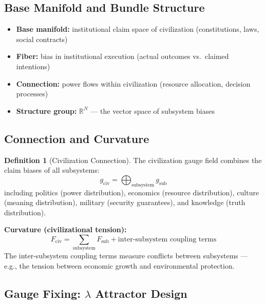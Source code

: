 \documentclass[12pt,a4paper]{article}
\theoremstyle{plain}
\theoremstyle{definition}
\newtheorem{definition}[theorem]{Definition}
\newcommand{\R}{\mathbb{R}}
\begin{document}
\subsection{Base Manifold and Bundle Structure}

\begin{itemize}
    \item \textbf{Base manifold:} institutional claim space of civilization (constitutions, laws, social contracts)
    \item \textbf{Fiber:} bias in institutional execution (actual outcomes vs.\ claimed intentions)
    \item \textbf{Connection:} power flows within civilization (resource allocation, decision processes)
    \item \textbf{Structure group:} $\R^N$ — the vector space of subsystem biases
\end{itemize}

\subsection{Connection and Curvature}

\begin{definition}[Civilization Connection]
The civilization gauge field combines the claim biases of all subsystems:
\begin{equation}
    g_{\text{civ}} = \bigoplus_{\text{subsystem}} g_{\text{sub}}
\end{equation}
including politics (power distribution), economics (resource distribution), culture (meaning distribution),
military (security guarantees), and knowledge (truth distribution).

\textbf{Curvature (civilizational tension):}
\begin{equation}
    F_{\text{civ}} = \sum_{\text{subsystem}} F_{\text{sub}} + \text{inter-subsystem coupling terms}
\end{equation}
The inter-subsystem coupling terms measure conflicts between subsystems — e.g., the tension between economic growth and environmental protection.
\end{definition}

\subsection{Gauge Fixing: $\lambda$ Attractor Design}
\end{document}
